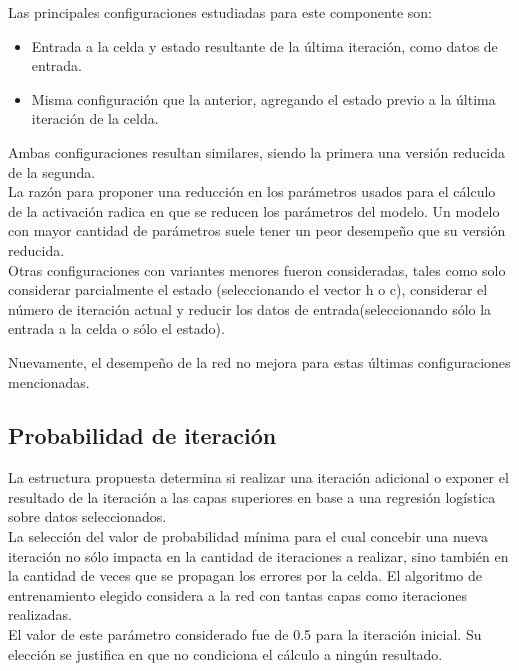\documentclass{article}
\begin{document}
Las principales configuraciones estudiadas para este componente son:

\begin{itemize}
\item Entrada a la celda y estado resultante de la última iteración, como datos de entrada.

\item Misma configuración que la anterior, agregando el estado previo a la última iteración de la celda.

\end{itemize}

Ambas configuraciones resultan similares, siendo la primera una versión reducida de la segunda.\\

La razón para proponer una reducción en los parámetros usados para el cálculo de la activación radica en que se reducen los parámetros del modelo. Un modelo con mayor cantidad de parámetros suele tener un peor desempeño que su versión reducida.\\

Otras configuraciones con variantes menores fueron consideradas, tales como solo considerar parcialmente el estado (seleccionando el vector h o c), considerar el número de iteración actual y reducir los datos de entrada(seleccionando sólo la entrada a la celda o sólo el estado).

Nuevamente, el desempeño de la red no mejora para estas últimas configuraciones mencionadas.

\subsection{Probabilidad de iteración}
La estructura propuesta determina si realizar una iteración adicional o exponer el resultado de la iteración a las capas superiores en base a una regresión logística sobre datos seleccionados.\\

La selección del valor de probabilidad mínima para el cual concebir una nueva iteración no sólo impacta en la cantidad de iteraciones a realizar, sino también en la cantidad de veces que se propagan los errores por la celda. El algoritmo de entrenamiento elegido considera a la red con tantas capas como iteraciones realizadas.\\

El valor de este parámetro considerado fue de 0.5 para la iteración inicial. Su elección se justifica en que no condiciona el cálculo a ningún resultado.\\
\end{document}
